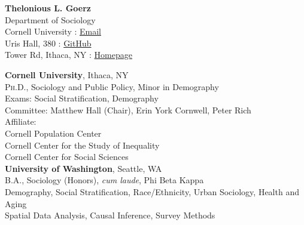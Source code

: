 \documentclass[11pt]{article} %
\begin{document}
{\Large \textbf{Thelonious L. Goerz}} \\


Department of Sociology \\
Cornell University \hfill {} : \href{mailto:theloniouslgoerz@gmail.com}{Email}\\ %
Uris Hall, 380  \hfill {} : \href{https://github.com/theloniousgoerz/}{GitHub}\\ %
Tower Rd, Ithaca, NY \hfill {} : \href{theloniousgoerz.github.io}{Homepage} \\

\vspace{0.001\textheight} %




  \textbf{Cornell University}, Ithaca, NY \\
 \textsc{Ph.D.}, Sociology and Public Policy, Minor in Demography \\
\hspace*{10mm} Exams: Social Stratification, Demography\\
Committee: Matthew Hall (Chair), Erin York Cornwell, Peter Rich  \\
Affiliate: \\
\hspace*{10mm} Cornell Population Center 
\\ \hspace*{10mm} Cornell Center for the Study of Inequality \\
\hspace*{10mm} Cornell Center for Social Sciences \\

 
 \textbf{University of Washington}, Seattle, WA\\
\textsc{B.A.}, Sociology (Honors), \emph{cum laude}, Phi Beta Kappa \\

\large{} Demography, Social Stratification, Race/Ethnicity, Urban Sociology, Health and Aging \\
\large{} Spatial Data Analysis, Causal Inference, Survey Methods \\
\end{document}
